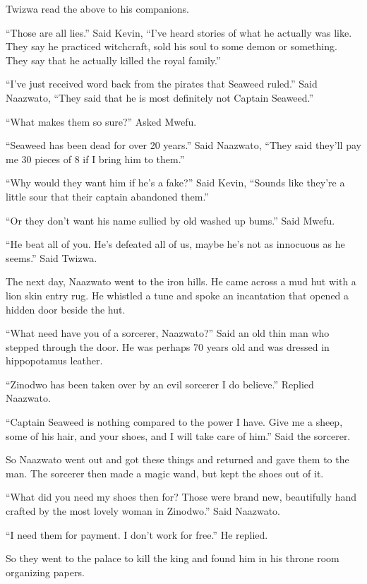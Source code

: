 Twizwa read the above to his companions.

``Those are all lies.'' Said Kevin, ``I've heard stories of what he actually was like. They say he practiced witchcraft, sold his soul to some demon or something. They say that he actually killed the royal family.''

``I've just received word back from the pirates that Seaweed ruled.'' Said Naazwato, ``They said that he is most definitely not Captain Seaweed.''

``What makes them so sure?'' Asked Mwefu.

``Seaweed has been dead for over 20 years.'' Said Naazwato, ``They said they'll pay me 30 pieces of 8 if I bring him to them.''

``Why would they want him if he's a fake?'' Said Kevin, ``Sounds like they're a little sour that their captain abandoned them.''

``Or they don't want his name sullied by old washed up bums.'' Said Mwefu.

``He beat all of you. He's defeated all of us, maybe he's not as innocuous as he seems.'' Said Twizwa.

\tbreak

The next day, Naazwato went to the iron hills. He came across a mud hut with a lion skin entry rug. He whistled a tune and spoke an incantation that opened a hidden door beside the hut.

``What need have you of a sorcerer, Naazwato?'' Said an old thin man who stepped through the door. He was perhaps 70 years old and was dressed in hippopotamus leather.

``Zinodwo has been taken over by an evil sorcerer I do believe.'' Replied Naazwato.

``Captain Seaweed is nothing compared to the power I have. Give me a sheep, some of his hair, and your shoes, and I will take care of him.'' Said the sorcerer.

So Naazwato went out and got these things and returned and gave them to the man. The sorcerer then made a magic wand, but kept the shoes out of it.

``What did you need my shoes then for? Those were brand new, beautifully hand crafted by the most lovely woman in Zinodwo.'' Said Naazwato.

``I need them for payment. I don't work for free.'' He replied.

So they went to the palace to kill the king and found him in his throne room organizing papers.

